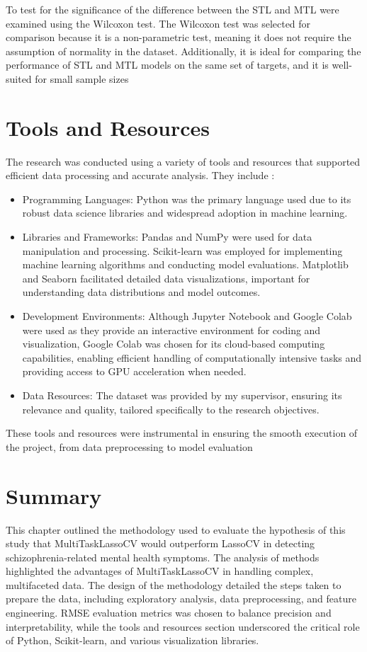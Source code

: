 To test for the significance of the difference between the STL and MTL were examined using the Wilcoxon test. The Wilcoxon test was selected for comparison because it is a non-parametric test, meaning it does not require the assumption of normality in the dataset. Additionally, it is ideal for comparing the performance of STL and MTL models on the same set of targets, and it is well-suited for small sample sizes \citep{tseng2020using}


\section{Tools and Resources}
The research was conducted using a variety of tools and resources that supported efficient data processing and accurate analysis. They include :
\begin{itemize}
    \item Programming Languages: Python was the primary language used due to its robust data science libraries and widespread adoption in machine learning.
    \item Libraries and Frameworks: Pandas and NumPy were used for data manipulation and processing. Scikit-learn was employed for implementing machine learning algorithms and conducting model evaluations. Matplotlib and Seaborn facilitated detailed data visualizations, important for understanding data distributions and model outcomes.
   \item Development Environments: Although Jupyter Notebook and Google Colab were used as they provide an interactive environment for coding and visualization, Google Colab was chosen for its cloud-based computing capabilities, enabling efficient handling of computationally intensive tasks and providing access to GPU acceleration when needed.
   \item Data Resources: The dataset was provided by my supervisor, ensuring its relevance and quality, tailored specifically to the research objectives.
\end{itemize}

These tools and resources were instrumental in ensuring the smooth execution of the project, from data preprocessing to model evaluation

\section{Summary} 
This chapter outlined the methodology used to evaluate the hypothesis of this study that      MultiTaskLassoCV would outperform LassoCV in detecting schizophrenia-related mental health symptoms. The analysis of methods highlighted the advantages of MultiTaskLassoCV in handling complex, multifaceted data. The design of the methodology detailed the steps taken to prepare the data, including exploratory analysis, data preprocessing, and feature engineering. RMSE evaluation metrics was chosen to balance precision and interpretability, while the tools and resources section underscored the critical role of Python, Scikit-learn, and various visualization libraries.

   

\def\baselinestretch{1.66}
\medskip


